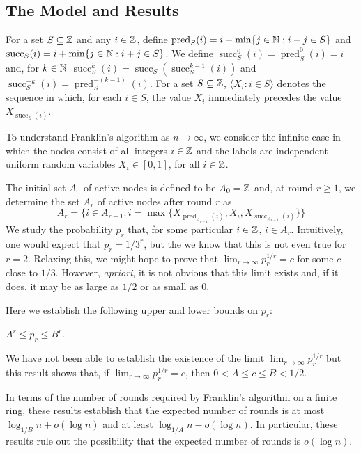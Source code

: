 \documentclass{patmorin}
\DeclareMathOperator{\cw}{succ}
\DeclareMathOperator{\ccw}{pred}
\begin{document}
\subsection{The Model and Results}

For a set $S\subseteq\mathbb{Z}$ and any $i\in\mathbb{Z}$, define $\ccw_S(i) =
i-\min\{j\in\N: i-j\in S\}$ and $\cw_S(i) = i+\min\{j\in\N: i+j\in S\}$.
We define $\cw_S^0(i)=\ccw_S^0(i)=i$ and, for $k\in\mathbb{N}$ $\cw_S^k(i) =
\cw_S(\cw_S^{k-1}(i))$ and $\cw_S^{-k}(i) = \ccw_S^{-(k-1)}(i)$.
For a set $S\subseteq\mathbb{Z}$, $\langle X_i: i\in S\rangle$ denotes the
sequence in which, for each $i\in S$, the value $X_i$ immediately precedes
the value $X_{\cw_S(i)}$.

To understand Franklin's algorithm as $n\to\infty$, we consider the infinite
case in which the nodes consist of all integers $i\in \mathbb{Z}$ and the labels are
independent uniform random variables $X_i\in[0,1]$, for all $i\in\mathbb{Z}$.

The initial set $A_0$ of active nodes is defined to be $A_0=\mathbb{Z}$ and, at round $r\ge 1$, we determine the set $A_r$ of active nodes after round $r$ as 
\[
    A_r = \{i \in A_{r-1} : i = \max\{X_{\ccw_{A_{r-1}}(i)},X_i,
                                      X_{\cw_{A_{r-1}}(i)}\} \} 
\] 
We study the probability $p_r$ that, for some particular $i\in\mathbb{Z}$,
$i\in A_r$.  Intuitively, one would expect that $p_r=1/3^r$, but the
we know that this is not even true for $r=2$.  Relaxing this, we might
hope to prove that $\lim_{r\to\infty} p_r^{1/r} = c$ for some $c$ close
to $1/3$.  However, \emph{apriori}, it is not obvious that this limit
exists and, if it does, it may be as large as $1/2$ or as small as $0$.

Here we establish the following upper and lower bounds on $p_r$:

\begin{thm}
   $A^r \le p_r \le B^r$.
\end{thm}

We have not been able to establish the existence of the limit
$\lim_{r\to\infty} p_r^{1/r}$ but this result shows that, if
$\lim_{r\to\infty} p_r^{1/r}=c$, then $0 < A \le c\le  B < 1/2$.

In terms of the number of rounds required by Franklin's algorithm on
a finite ring, these results establish that the expected number of
rounds is at most $\log_{1/B} n + o(\log n)$ and at least $\log_{1/A}
n- o(\log n)$.  In particular, these results rule out the possibility
that the expected number of rounds is $o(\log n)$.
\end{document}
